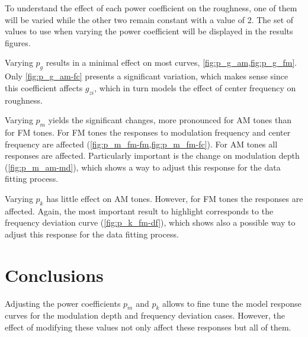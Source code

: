 \documentclass{article}
\begin{document}
To understand the effect of each power coefficient on the roughness, one of them
will be varied while the other two remain constant with a value of 2. The set
of values to use when varying the power coefficient will be displayed in the
results figures.

Varying $p_g$ results in a minimal effect on most curves,
\cref{fig:p_g_am,fig:p_g_fm}. Only \cref{fig:p_g_am-fc} presents a significant
variation, which makes sense since this coefficient affects $g_{zi}$, which in
turn models the effect of center frequency on roughness.


Varying $p_m$ yields the significant changes, more pronounced for AM tones than
for FM tones. For FM tones the responses to modulation frequency and center
frequency are affected (\cref{fig:p_m_fm-fm,fig:p_m_fm-fc}). For AM tones all
responses are affected. Particularly important is the change on modulation depth
(\cref{fig:p_m_am-md}), which shows a way to adjust this response for the data
fitting process.


Varying $p_k$ has little effect on AM tones. However, for FM tones the
responses are affected. Again, the most important result to highlight
corresponds to the frequency deviation curve (\cref{fig:p_k_fm-df}), which
shows also a possible way to adjust this response for the data fitting process.


\section{Conclusions}

Adjusting the power coefficients $p_m$ and $p_k$ allows to fine tune the model
response curves for the modulation depth and frequency deviation cases. However,
the effect of modifying these values not only affect these responses but all of
them.

\mybibliography{}
\end{document}
